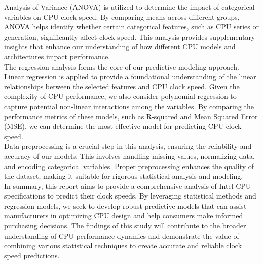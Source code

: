 Analysis of Variance (ANOVA) is utilized to determine the impact of categorical variables on CPU clock speed. By comparing means across different groups, ANOVA helps identify whether certain categorical features, such as CPU series or generation, significantly affect clock speed. This analysis provides supplementary insights that enhance our understanding of how different CPU models and architectures impact performance.\\

The regression analysis forms the core of our predictive modeling approach. Linear regression is applied to provide a foundational understanding of the linear relationships between the selected features and CPU clock speed. Given the complexity of CPU performance, we also consider polynomial regression to capture potential non-linear interactions among the variables. By comparing the performance metrics of these models, such as R-squared and Mean Squared Error (MSE), we can determine the most effective model for predicting CPU clock speed.\\

Data preprocessing is a crucial step in this analysis, ensuring the reliability and accuracy of our models. This involves handling missing values, normalizing data, and encoding categorical variables. Proper preprocessing enhances the quality of the dataset, making it suitable for rigorous statistical analysis and modeling.\\

In summary, this report aims to provide a comprehensive analysis of Intel CPU specifications to predict their clock speeds. By leveraging statistical methods and regression models, we seek to develop robust predictive models that can assist manufacturers in optimizing CPU design and help consumers make informed purchasing decisions. The findings of this study will contribute to the broader understanding of CPU performance dynamics and demonstrate the value of combining various statistical techniques to create accurate and reliable clock speed predictions.\\

\newpage